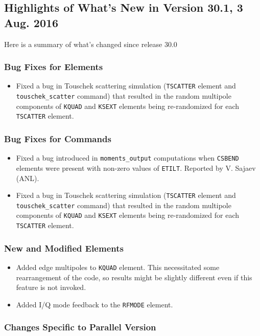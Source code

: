 \documentclass[11pt]{article}
\begin{document}
\subsection{Highlights of What's New in Version 30.1, 3 Aug. 2016}

Here is a summary of what's changed since release 30.0

\subsubsection{Bug Fixes for Elements}

\begin{itemize}
\item Fixed a bug in Touschek scattering simulation (\verb|TSCATTER| element and \verb|touschek_scatter| command) that resulted
  in the random multipole components of \verb|KQUAD| and \verb|KSEXT| elements being re-randomized for each \verb|TSCATTER| element.
\end{itemize}

\subsubsection{Bug Fixes for Commands}
\begin{itemize}
\item Fixed a bug introduced in \verb|moments_output| computations when \verb|CSBEND| elements were present 
  with non-zero values of \verb|ETILT|. Reported by V. Sajaev (ANL).
\item Fixed a bug in Touschek scattering simulation (\verb|TSCATTER| element and \verb|touschek_scatter| command) that resulted
  in the random multipole components of \verb|KQUAD| and \verb|KSEXT| elements being re-randomized for each \verb|TSCATTER| element.
\end{itemize}

\subsubsection{New and Modified Elements}
\begin{itemize}
\item Added edge multipoles to \verb|KQUAD| element. This necessitated some rearrangement of the code, so results might be
  slightly different even if this feature is not invoked.
\item Added I/Q mode feedback to the \verb|RFMODE| element.
\end{itemize}

\subsubsection{Changes Specific to Parallel Version}
\end{document}
